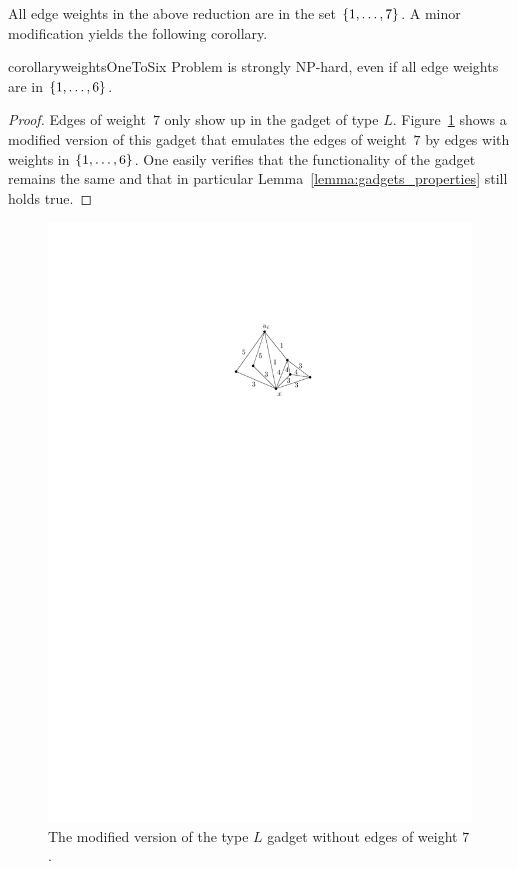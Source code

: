 All edge weights in the above reduction are in the set $\{ 1, \ldots, 7 \}$.
A minor modification yields the following corollary.
\begin{restatable}{corollary}{weightsOneToSix}
\label{coro:small-weights}
Problem {\xxxNTP} is strongly NP-hard, even if all edge weights are in $\{ 1, \ldots, 6 \}$.
\end{restatable}
\begin{proof}
Edges of weight~$7$ only show up in the gadget of type $L$.
Figure~\ref{fig_hamilton_cycle_improved} shows a modified version of this gadget that emulates 
the edges of weight~$7$ by edges with weights in $\{ 1, \ldots, 6 \}$.
One easily verifies that the functionality of the gadget remains the same and that in particular
Lemma~\ref{lemma:gadgets_properties} still holds true.
\end{proof}
\begin{figure}[htpb]
\centering
\includegraphics[scale=1.1]{chapter-6-NTP/act-hamilton-cycle-b}
\caption{The modified version of the type $L$ gadget without edges of weight $7$.}
\label{fig_hamilton_cycle_improved}
\end{figure}

